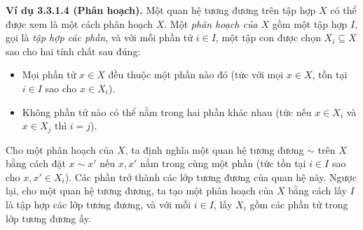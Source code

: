 \noindent\textbf{Ví dụ 3.3.1.4 (Phân hoạch).} Một quan hệ tương đương trên tập hợp $X$ có thể được xem là một cách phân hoạch $X$. Một \emph{phân hoạch của $X$} gồm một tập hợp $I$, gọi là \emph{tập hợp các phần}, và với mỗi phần tử $i\in I$, một tập con được chọn $X_i\subseteq X$ sao cho hai tính chất sau đúng:
\begin{itemize}
\item Mọi phần tử $x\in X$ đều thuộc một phần nào đó (tức với mọi $x\in X$, tồn tại $i\in I$ sao cho $x\in X_i$).
\item Không phần tử nào có thể nằm trong hai phần khác nhau (tức nếu $x\in X_i$ và $x\in X_j$ thì $i=j$).
\end{itemize}
Cho một phân hoạch của $X$, ta định nghĩa một quan hệ tương đương $\sim$ trên $X$ bằng cách đặt $x\sim x'$ nếu $x,x'$ nằm trong cùng một phần (tức tồn tại $i\in I$ sao cho $x,x'\in X_i$). Các phần trở thành các lớp tương đương của quan hệ này. Ngược lại, cho một quan hệ tương đương, ta tạo một phân hoạch của $X$ bằng cách lấy $I$ là tập hợp các lớp tương đương, và với mỗi $i\in I$, lấy $X_i$ gồm các phần tử trong lớp tương đương ấy.

